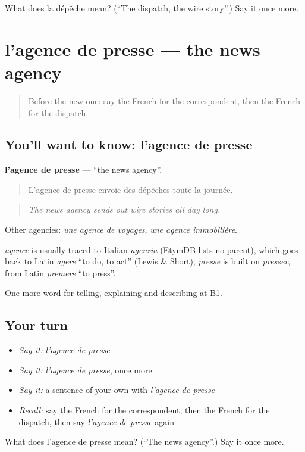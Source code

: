 \begin{tcolorbox}[breakable,colback=teal!4,colframe=teal!35!black,title={Before you move on}]
What does la dépêche mean? (\textquotedblleft{}The dispatch, the wire story\textquotedblright{}.) Say it once more.
\end{tcolorbox}
\section[l'agence de presse]{l'agence de presse — the news agency}

\label{lesson:FR-C281-agence-de-presse}



\begin{quote}
Before the new one: say the French for the correspondent, then the French for the dispatch.
\end{quote}

\subsection*{You'll want to know: l'agence de presse}
\textbf{l'agence de presse} — \textquotedblleft{}the news agency\textquotedblright{}.

\begin{quote}
L'agence de presse envoie des dépêches toute la journée.
\end{quote}

\begin{quote}
\emph{The news agency sends out wire stories all day long.}
\end{quote}

Other agencies: \emph{une agence de voyages}, \emph{une agence immobilière}.

\begin{cousinweb}
\emph{agence} is usually traced to Italian \emph{agenzia} (EtymDB lists no parent), which goes back to Latin \emph{agere} \textquotedblleft{}to do, to act\textquotedblright{} (Lewis \& Short); \emph{presse} is built on \emph{presser}, from Latin \emph{premere} \textquotedblleft{}to press\textquotedblright{}.
\end{cousinweb}

\begin{grammarlens}[title={What you've built}]
One more word for telling, explaining and describing at B1.
\end{grammarlens}

\subsection*{Your turn}
\begin{itemize}
\raggedright
  \item \emph{Say it:} \emph{l'agence de presse}
  \item \emph{Say it:} \emph{l'agence de presse}, once more
  \item \emph{Say it:} a sentence of your own with \emph{l'agence de presse}
  \item \emph{Recall:} say the French for the correspondent, then the French for the dispatch, then say \emph{l'agence de presse} again
\end{itemize}

\begin{tcolorbox}[breakable,colback=teal!4,colframe=teal!35!black,title={Before you move on}]
What does l'agence de presse mean? (\textquotedblleft{}The news agency\textquotedblright{}.) Say it once more.
\end{tcolorbox}
